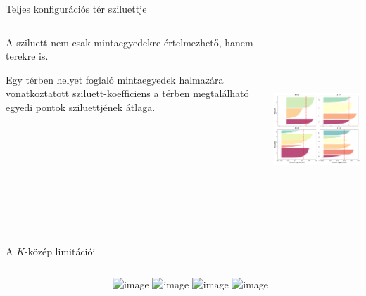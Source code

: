 \documentclass[english, aspectratio=169]{beamer}
\begin{document}
\begin{frame}{Teljes konfigurációs tér sziluettje}
\begin{columns}
\begin{column}{.4\textwidth}
A sziluett nem csak mintaegyedekre értelmezhető, hanem terekre is.\par\smallskip
Egy térben helyet foglaló mintaegyedek halmazára vonatkoztatott sziluett-koefficiens a térben megtalálható egyedi pontok sziluettjének átlaga.
\end{column}
\begin{column}{.6\textwidth}
\begin{center}
\includegraphics[width=8cm, height=7cm, keepaspectratio]{images/unsupervised_32.png}
\end{center}
\end{column}
\end{columns}
\end{frame}

\begin{frame}{A $K$-közép limitációi}
\begin{columns}
\begin{column}{.5\textwidth}
\end{column}
\begin{column}{.5\textwidth}
\begin{center}
\includegraphics<1>[width=7cm, keepaspectratio]{images/unsupervised_28.png}
\includegraphics<2>[width=7cm, keepaspectratio]{images/unsupervised_29.png}
\includegraphics<3>[width=7cm, keepaspectratio]{images/unsupervised_33.png}
\includegraphics<4>[width=7cm, keepaspectratio]{images/unsupervised_34.png}
\end{center}
\end{column}
\end{columns}
\end{frame}
\end{document}
